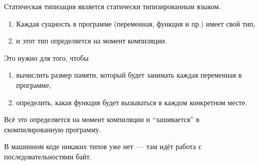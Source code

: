 \documentclass[aspectration=1610]{beamer}
\begin{document}
\begin{frame}{Статическая типизация}
\langcpp является статически типизированным языком.
\medskip

\begin{enumerate}
    \item Каждая сущность в программе (переменная, функция и пр.) имеет свой
        тип,
    \item и этот тип определяется на момент компиляции. 
\end{enumerate}
Это нужно для того, чтобы
\begin{enumerate}
    \item вычислить размер памяти, который будет занимать каждая
переменная в программе,
    \item определить, какая функция будет вызываться в каждом конкретном месте. 
\end{enumerate}        

Всё это определяется на
момент компиляции и ``зашивается'' в скомпилированную программу. 

В машинном коде никаких типов уже нет~--- там идёт работа с последовательностями байт. 
\end{frame}
\end{document}
